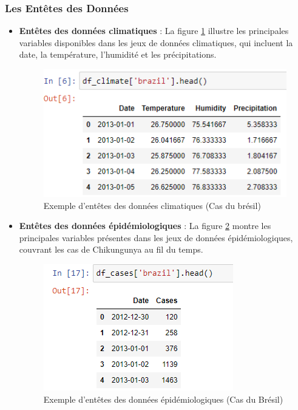 \subsubsection*{Les Entêtes des Données}
\begin{itemize}
	\item \textbf{Entêtes des données climatiques} : La figure \ref{fig:climatedatasetsample} illustre les principales variables disponibles dans les jeux de données climatiques, qui incluent la date, la température, l'humidité et les précipitations.
	\begin{figure}[h!]
		\centering
		\includegraphics[width=0.8\linewidth]{images/climate_dataset_sample}
		\caption[Exemple d'entêtes des données climatiques]{Exemple d'entêtes des données climatiques (Cas du brésil)}
		\label{fig:climatedatasetsample}
	\end{figure}
	
	\item \textbf{Entêtes des données épidémiologiques} : La figure \ref{fig:casesdatasetsample} montre les principales variables présentes dans les jeux de données épidémiologiques, couvrant les cas de Chikungunya au fil du temps.
	\begin{figure}[h!]
		\centering
		\includegraphics[width=0.7\linewidth]{images/cases_dataset_sample}
		\caption[Exemple d'entêtes des données épidémiologiques]{Exemple d'entêtes des données épidémiologiques (Cas du Brésil)}
		\label{fig:casesdatasetsample}
	\end{figure}
\end{itemize}

